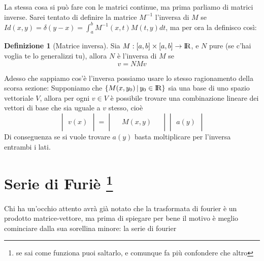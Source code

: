 \documentclass[11pt,a4paper]{report}
\theoremstyle{definition}
\newtheorem{definizione}{Definizione}
\theoremstyle{plain}
\theoremstyle{plain}
\begin{document}
			La stessa cosa si può fare con le matrici continue, ma prima parliamo di matrici inverse.\newline
			Sarei tentato di definire la matrice $M^{-1}$ l'inversa di $M$ se $Id(x,y)=\delta (y-x)=\int_a^b M^{-1}(x,t) M(t,y) dt$, ma per ora la definisco così:\newline
			\begin{definizione}[Matrice inversa]
				Sia $M:[a,b]\times [a,b]\rightarrow \rm I\!R$, e $N$ pure (se c'hai voglia te lo generalizzi tu), allora $N$ è l'inversa di $M$ se
				\begin{equation}
					v=NMv
				\end{equation}
			\end{definizione}
			Adesso che sappiamo cos'è l'inversa possiamo usare lo stesso ragionamento della scorsa sezione: Supponiamo che $\{M(x,y_0)\,|\, y_0\in \rm I\!R \}$ sia una base di uno spazio vettoriale $V$, allora per ogni $v\in V$ è possibile trovare una combinazione lineare dei vettori di base che sia uguale a $v$ stesso, cioè
			\begin{equation}
			\label{combinazione lineare matrice}
				\begin{vmatrix}
					\\
					v(x)\\
					\quad
				\end{vmatrix}
				=
				\begin{vmatrix}
					\, & & \, \\
					& M(x,y) & \\
					& & 
				\end{vmatrix}
				\begin{vmatrix}
					\\
					a(y)\\
					\quad
				\end{vmatrix}
			\end{equation}
			Di conseguenza se si vuole trovare $a(y)$ basta moltiplicare per l'inversa entrambi i lati.



		\section{Serie di Furiè \protect\footnote{se sai come funziona puoi saltarlo, e comunque fa più confondere che altro}}
			Chi ha un'occhio attento avrà già notato che la trasformata di fourier è un prodotto matrice-vettore, ma prima di spiegare per bene il motivo è meglio cominciare dalla sua sorellina minore: la serie di fourier\newline 
\end{document}
